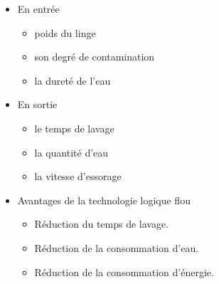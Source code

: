 \documentclass[aspectratio=169,professionalfonts, 12pt]{beamer}
\begin{document}
\begin{frame}
  \begin{columns}[T] 

    \begin{column}{.5\textwidth}
      
			\begin{itemize}[<+->]
				\item En entrée
				\begin{itemize}[<+->]
					\item poids du linge
					\item son degré de contamination
					\item la dureté de l'eau
				\end{itemize}
      \end{itemize}
      
      \begin{itemize}[<+->]
				\item En sortie
				\begin{itemize}[<+->]
					\item le temps de lavage
					\item la quantité d’eau
					\item la vitesse d'essorage
				\end{itemize}
      \end{itemize}
      
      
      
      \begin{itemize}[<+->]
        \item Avantages de la technologie logique flou
				\begin{itemize}[<+->]
					\item Réduction du temps de lavage.
					\item Réduction de la consommation d'eau.
					\item Réduction de la consommation d'énergie.
				\end{itemize}
      \end{itemize}
      
    \end{column}   


\end{columns}
\end{frame}
\end{document}
